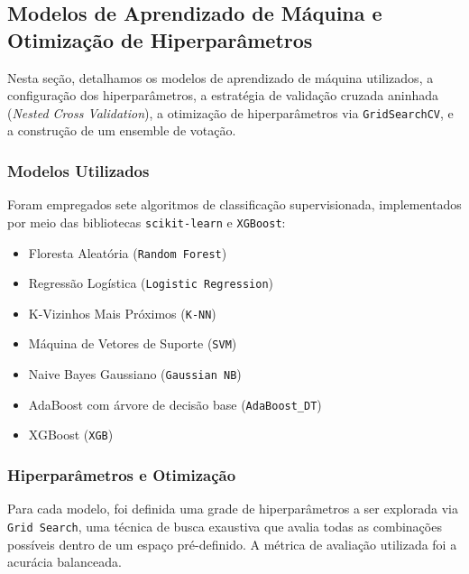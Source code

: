 \documentclass[a4paper]{article}
\theoremstyle{plain}
\theoremstyle{definition}
\begin{document}


\subsection{Modelos de Aprendizado de Máquina e Otimização de Hiperparâmetros}

Nesta seção, detalhamos os modelos de aprendizado de máquina utilizados, a configuração dos hiperparâmetros, a estratégia de validação cruzada aninhada (\textit{Nested Cross Validation}), a otimização de hiperparâmetros via \texttt{GridSearchCV}, e a construção de um ensemble de votação.

\subsubsection{Modelos Utilizados}
Foram empregados sete algoritmos de classificação supervisionada, implementados por meio das bibliotecas \texttt{scikit-learn} e \texttt{XGBoost}:

\begin{itemize}
    \item Floresta Aleatória (\texttt{Random Forest})
    \item Regressão Logística (\texttt{Logistic Regression})
    \item K-Vizinhos Mais Próximos (\texttt{K-NN})
    \item Máquina de Vetores de Suporte (\texttt{SVM})
    \item Naive Bayes Gaussiano (\texttt{Gaussian NB})
    \item AdaBoost com árvore de decisão base (\texttt{AdaBoost\_DT})
    \item XGBoost (\texttt{XGB})
\end{itemize}

\subsubsection{Hiperparâmetros e Otimização}
Para cada modelo, foi definida uma grade de hiperparâmetros a ser explorada via \texttt{Grid Search}, uma técnica de busca exaustiva que avalia todas as combinações possíveis dentro de um espaço pré-definido. A métrica de avaliação utilizada foi a acurácia balanceada.
\end{document}
